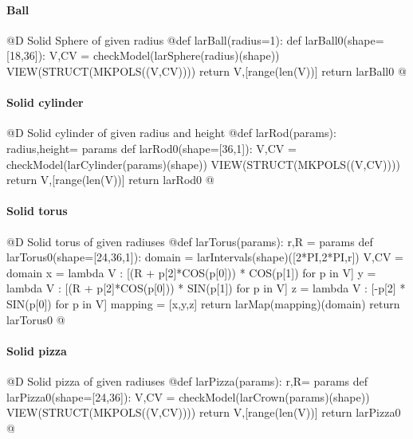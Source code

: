 \documentclass[11pt,oneside]{article}	%
\begin{document}
\paragraph{Ball}
@D Solid Sphere of given radius
@{def larBall(radius=1):
	def larBall0(shape=[18,36]):
		V,CV = checkModel(larSphere(radius)(shape))
		VIEW(STRUCT(MKPOLS((V,CV))))
		return V,[range(len(V))]
	return larBall0
@}

\paragraph{Solid cylinder}
@D Solid cylinder of given radius and height
@{def larRod(params):
	radius,height= params
	def larRod0(shape=[36,1]):
		V,CV = checkModel(larCylinder(params)(shape))
		VIEW(STRUCT(MKPOLS((V,CV))))
		return V,[range(len(V))]
	return larRod0
@}

\paragraph{Solid torus}
@D Solid torus of given radiuses
@{def larTorus(params):
	r,R = params
	def larTorus0(shape=[24,36,1]):
		domain = larIntervals(shape)([2*PI,2*PI,r])
		V,CV = domain
		x = lambda V : [(R + p[2]*COS(p[0])) * COS(p[1]) for p in V]
		y = lambda V : [(R + p[2]*COS(p[0])) * SIN(p[1]) for p in V]
		z = lambda V : [-p[2] * SIN(p[0]) for p in V]
		mapping = [x,y,z]
		return larMap(mapping)(domain)
	return larTorus0
@}

\paragraph{Solid pizza}
@D Solid pizza of given radiuses
@{def larPizza(params):
	r,R= params
	def larPizza0(shape=[24,36]):
		V,CV = checkModel(larCrown(params)(shape))
		VIEW(STRUCT(MKPOLS((V,CV))))
		return V,[range(len(V))]
	return larPizza0
@}
\end{document}
